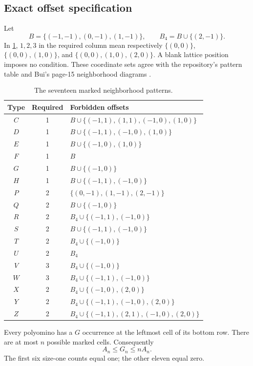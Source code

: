 \documentclass[11pt,a4paper]{article}
\theoremstyle{definition}
\theoremstyle{remark}
\begin{document}
\subsection{Exact offset specification}
Let
\[
 B=\{(-1,-1),(0,-1),(1,-1)\},\qquad
 B_4=B\cup\{(2,-1)\}.
\]
In \cref{tab:patterns}, $1,2,3$ in the required column mean respectively
$\{(0,0)\}$, $\{(0,0),(1,0)\}$, and
$\{(0,0),(1,0),(2,0)\}$. A blank lattice position imposes no condition.
These coordinate sets agree with the repository's pattern table and Bui's
page-15 neighborhood diagrams \cite{repopatterns,bui}.

\begin{table}[htbp]
\centering\small
\begin{tabular}{@{}ccl@{}}
\toprule
Type & Required & Forbidden offsets\\
\midrule
$C$ & 1 & $B\cup\{(-1,1),(1,1),(-1,0),(1,0)\}$\\
$D$ & 1 & $B\cup\{(-1,1),(-1,0),(1,0)\}$\\
$E$ & 1 & $B\cup\{(-1,0),(1,0)\}$\\
$F$ & 1 & $B$\\
$G$ & 1 & $B\cup\{(-1,0)\}$\\
$H$ & 1 & $B\cup\{(-1,1),(-1,0)\}$\\
$P$ & 2 & $\{(0,-1),(1,-1),(2,-1)\}$\\
$Q$ & 2 & $B\cup\{(-1,0)\}$\\
$R$ & 2 & $B_4\cup\{(-1,1),(-1,0)\}$\\
$S$ & 2 & $B\cup\{(-1,1),(-1,0)\}$\\
$T$ & 2 & $B_4\cup\{(-1,0)\}$\\
$U$ & 2 & $B_4$\\
$V$ & 3 & $B_4\cup\{(-1,0)\}$\\
$W$ & 3 & $B_4\cup\{(-1,1),(-1,0)\}$\\
$X$ & 2 & $B_4\cup\{(-1,0),(2,0)\}$\\
$Y$ & 2 & $B_4\cup\{(-1,1),(-1,0),(2,0)\}$\\
$Z$ & 2 & $B_4\cup\{(-1,1),(2,1),(-1,0),(2,0)\}$\\
\bottomrule
\end{tabular}
\caption{The seventeen marked neighborhood patterns.}
\label{tab:patterns}
\end{table}

Every polyomino has a $G$ occurrence at the leftmost cell of its bottom row.
There are at most $n$ possible marked cells. Consequently
\begin{equation}\label{eq:gdom}
 A_n\leq G_n\leq nA_n.
\end{equation}
The first six size-one counts equal one; the other eleven equal zero.
\end{document}
